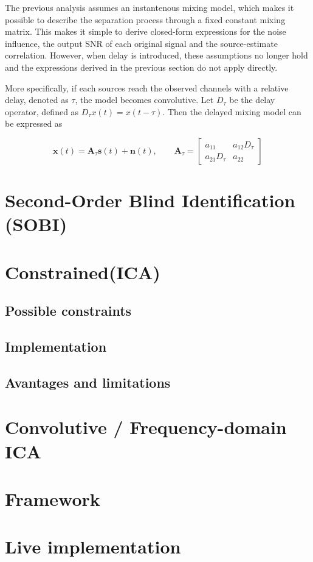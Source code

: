 The previous analysis assumes an instantenous mixing model, which makes it possible to describe the separation process through a fixed constant mixing matrix. This makes it simple to derive closed-form expressions for the noise influence, the output SNR of each original signal and the source-estimate correlation. However, when delay is introduced, these assumptions no longer hold and the expressions derived in the previous section do not apply directly.

More specifically, if each sources reach the observed channels with a relative delay, denoted as $\tau$, the model becomes convolutive. Let $D_\tau$ be the delay operator, defined as $D_\tau x(t)=x(t-\tau).$ Then the delayed mixing model can be expressed as 

\begin{equation}
    \mathbf{x}(t)=\mathbf{A}_{\tau}\mathbf{s}(t)+\mathbf{n}(t),
    \qquad
    \mathbf{A}_{\tau}=
    \begin{bmatrix}
    a_{11} & a_{12}D_{\tau}\\
    a_{21}D_{\tau} & a_{22}
    \end{bmatrix}
\label{eq:conv_matrix_model}
\end{equation}



\section{Second-Order Blind Identification (SOBI)}
\section{Constrained(ICA)}
\subsection{Possible constraints}
\subsection{Implementation}
\subsection{Avantages and limitations}
\section{Convolutive / Frequency-domain ICA}
\section{Framework}
\section{Live implementation}